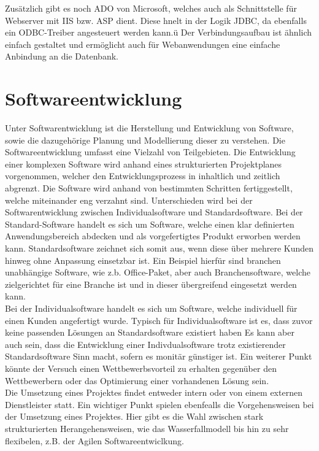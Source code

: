 Zusätzlich gibt es noch ADO von Microsoft, welches auch als Schnittstelle für Webserver mit IIS bzw. ASP dient.
Diese hnelt in der Logik JDBC, da ebenfalls ein ODBC-Treiber angesteuert werden kann.ü
Der Verbindungsaufbau ist ähnlich einfach gestaltet und ermöglicht auch für Webanwendungen eine einfache Anbindung an die Datenbank.

\section{Softwareentwicklung}
\label{sec:softdev}

Unter Softwarentwicklung ist die Herstellung und Entwicklung von Software, sowie die dazugehörige Planung und Modellierung dieser zu verstehen. Die Softwareentwicklung umfasst eine Vielzahl von Teilgebieten. Die Entwicklung einer komplexen Software wird anhand eines strukturierten Projektplanes vorgenommen, welcher den Entwicklungsprozess in inhaltlich und zeitlich abgrenzt. Die Software wird anhand von bestimmten Schritten fertiggestellt, welche miteinander eng verzahnt sind. Unterschieden wird bei der Softwarentwicklung zwischen Individualsoftware und Standardsoftware. Bei der Standard-Software handelt es sich um Software, welche einen klar definierten Anwendungsbereich abdecken und als vorgefertigtes Produkt erworben werden kann. Standardsoftware zeichnet sich somit aus, wenn diese über mehrere Kunden hinweg ohne Anpassung einsetzbar ist. Ein Beispiel hierfür sind branchen unabhängige Software, wie z.b. Office-Paket, aber auch Branchensoftware, welche zielgerichtet für eine Branche ist und in dieser übergreifend eingesetzt werden kann.\\
Bei der Individualsoftware handelt es sich um Software, welche individuell für einen Kunden angefertigt wurde. Typisch für Individualsoftware ist es, dass zuvor keine passenden Lösungen an Standardsoftware existiert haben  Es kann aber auch sein, dass die Entwicklung einer Indivdualsoftware trotz existierender Standardsoftware Sinn macht, sofern es monitär günstiger ist. Ein weiterer Punkt  könnte der Versuch einen Wettbewerbsvorteil zu erhalten gegenüber den Wettbewerbern oder das Optimierung einer vorhandenen Lösung sein.\\
Die Umsetzung eines Projektes findet entweder intern oder von einem externen Dienstleister statt. Ein wichtiger Punkt spielen ebenfealls die Vorgehensweisen bei der Umsetzung eines Projektes. Hier gibt es die Wahl zwischen stark strukturierten Herangehensweisen, wie das Wasserfallmodell bis hin zu sehr flexibelen, z.B. der Agilen Softwareentwiclkung.\\

